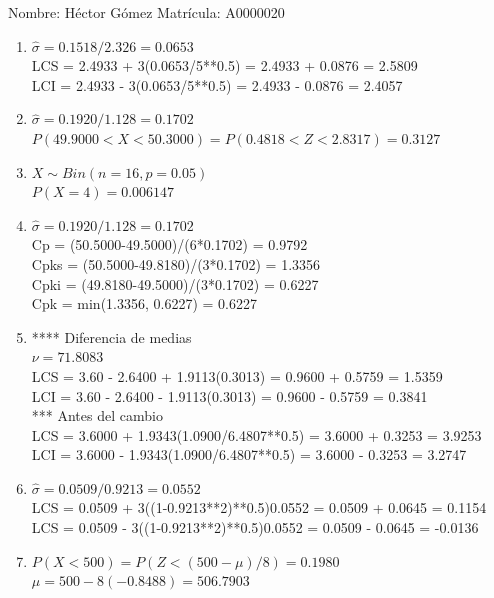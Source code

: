 \documentclass[8pt]{report}
\begin{document}
 \newpage

Nombre: \underline{\hspace*{.2in}}
Héctor Gómez
\underline{\hspace*{.2in}} \quad Matr\'icula:\underline{\hspace*{.2in}}
A0000020
\underline{\hspace*{.2in}} \\

\begin{enumerate}
\item $\hat\sigma = 0.1518/2.326 = 0.0653$\\
LCS = 2.4933 + 3(0.0653/5**0.5) = 2.4933 + 0.0876 = 2.5809\\
LCI = 2.4933 - 3(0.0653/5**0.5) = 2.4933 - 0.0876 = 2.4057
\item $\hat\sigma = 0.1920/1.128 = 0.1702$\\
$P(49.9000 < X < 50.3000) = P(0.4818 < Z < 2.8317) = 0.3127$\\
\item $X \sim Bin(n=16, p=0.05)$\\
$P(X = 4) = 0.006147$
\item $\hat\sigma = 0.1920/1.128 = 0.1702$\\
Cp = (50.5000-49.5000)/(6*0.1702) = 0.9792\\
Cpks = (50.5000-49.8180)/(3*0.1702) = 1.3356\\
Cpki = (49.8180-49.5000)/(3*0.1702) = 0.6227\\
Cpk = min(1.3356, 0.6227) = 0.6227
\item **** Diferencia de medias\\
$\nu = 71.8083$\\
LCS = 3.60 - 2.6400 + 1.9113(0.3013) = 0.9600 + 0.5759 = 1.5359\\
LCI = 3.60 - 2.6400 - 1.9113(0.3013) = 0.9600 - 0.5759 = 0.3841\\
*** Antes del cambio\\
LCS = 3.6000 + 1.9343(1.0900/6.4807**0.5) = 3.6000 + 0.3253 = 3.9253\\
LCI = 3.6000 - 1.9343(1.0900/6.4807**0.5) = 3.6000 - 0.3253 = 3.2747\\
\item $\hat\sigma = 0.0509/0.9213 = 0.0552$\\
LCS = 0.0509 + 3((1-0.9213**2)**0.5)0.0552 = 0.0509 + 0.0645 = 0.1154\\
LCS = 0.0509 - 3((1-0.9213**2)**0.5)0.0552 = 0.0509 - 0.0645 = -0.0136
\item $P(X < 500) = P(Z < (500-\mu)/8) = 0.1980$\\
$\mu = 500 - 8(-0.8488) = 506.7903$\\
\end{enumerate}

 \newpage
\end{document}

